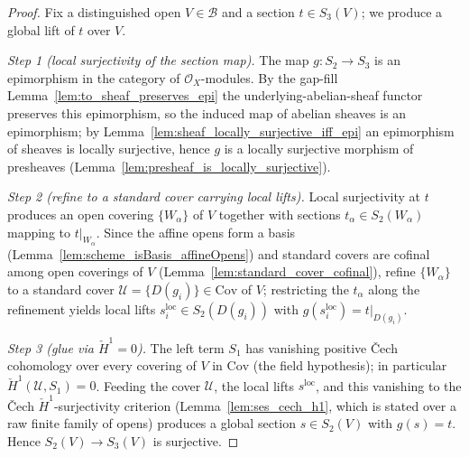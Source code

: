 \begin{proof}
    \leanok
  Fix a distinguished open \(V \in \mathcal{B}\) and a section \(t \in S_3(V)\); we produce a global
  lift of \(t\) over \(V\).

  \emph{Step 1 (local surjectivity of the section map).} The map \(g : S_2 \to S_3\) is an
  epimorphism in the category of \(\mathcal{O}_X\)-modules. By the gap-fill
  Lemma~\ref{lem:to_sheaf_preserves_epi} the underlying-abelian-sheaf functor preserves this
  epimorphism, so the induced map of abelian sheaves is an epimorphism; by
  Lemma~\ref{lem:sheaf_locally_surjective_iff_epi} an epimorphism of sheaves is locally surjective,
  hence \(g\) is a locally surjective morphism of presheaves
  (Lemma~\ref{lem:presheaf_is_locally_surjective}).

  \emph{Step 2 (refine to a standard cover carrying local lifts).} Local surjectivity at \(t\)
  produces an open covering \(\{W_\alpha\}\) of \(V\) together with sections
  \(t_\alpha \in S_2(W_\alpha)\) mapping to \(t|_{W_\alpha}\). Since the affine opens form a basis
  (Lemma~\ref{lem:scheme_isBasis_affineOpens}) and standard covers are cofinal among open coverings
  of \(V\) (Lemma~\ref{lem:standard_cover_cofinal}), refine \(\{W_\alpha\}\) to a standard cover
  \(\mathcal{U} = \{D(g_i)\} \in \mathrm{Cov}\) of \(V\); restricting the \(t_\alpha\) along the
  refinement yields local lifts \(s^{\mathrm{loc}}_i \in S_2(D(g_i))\) with
  \(g(s^{\mathrm{loc}}_i) = t|_{D(g_i)}\).

  \emph{Step 3 (glue via \(\check{H}^1 = 0\)).} The left term \(S_1\) has vanishing positive
  {\v C}ech cohomology over every covering of \(V\) in \(\mathrm{Cov}\) (the field hypothesis); in
  particular \(\check{H}^1(\mathcal{U}, S_1) = 0\). Feeding the cover \(\mathcal{U}\), the local lifts
  \(s^{\mathrm{loc}}\), and this vanishing to the {\v C}ech \(\check{H}^1\)-surjectivity criterion
  (Lemma~\ref{lem:ses_cech_h1}, which is stated over a raw finite family of opens) produces a global
  section \(s \in S_2(V)\) with \(g(s) = t\). Hence \(S_2(V) \to S_3(V)\) is surjective.
\end{proof}

